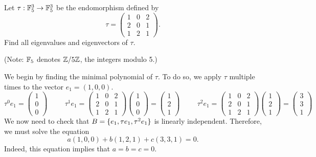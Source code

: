 \documentclass[notitlepage]{problem-solving}
\begin{document}
\begin{problem*}
	Let $\tau:\mathbb{F}_5^3\rightarrow\mathbb{F}_5^3$ be the endomorphism defined by
	\[
		\tau =
		\begin{pmatrix}
			1 & 0 & 2\\
			2 & 0 & 1\\
			1 & 2 & 1
		\end{pmatrix}.
	\]
	Find all eigenvalues and eigenvectors of $\tau$.

	(Note: $\mathbb{F}_5$ denotes $\mathbb{Z}/5\mathbb{Z}$, the integers modulo 5.)
\end{problem*}

We begin by finding the minimal polynomial of $\tau$.
To do so, we apply $\tau$ multiple times to the vector $e_1 = (1,0,0)$.
\[
	\tau^0 e_1 =
	\begin{pmatrix}
		1\\
		0\\
		0
	\end{pmatrix}
	\hspace{1cm}
	\tau^1 e_1 =
	\begin{pmatrix}
		1 & 0 & 2\\
		2 & 0 & 1\\
		1 & 2 & 1
	\end{pmatrix}
	\begin{pmatrix}
		1\\
		0\\
		0
	\end{pmatrix}
	=
	\begin{pmatrix}
		1\\
		2\\
		1
	\end{pmatrix}
	\hspace{1cm}
	\tau^2 e_1 =
	\begin{pmatrix}
		1 & 0 & 2\\
		2 & 0 & 1\\
		1 & 2 & 1
	\end{pmatrix}
	\begin{pmatrix}
		1\\
		2\\
		1
	\end{pmatrix}
	=
	\begin{pmatrix}
		3\\
		3\\
		1
	\end{pmatrix}
\]
We now need to check that $B=\lbrace e_1, \tau e_1, \tau^2 e_1 \rbrace$ is linearly independent.
Therefore, we must solve the equation
\[
	a(1,0,0)+b(1,2,1)+c(3,3,1)=0.
\]
Indeed, this equation implies that $a=b=c=0$.
\end{document}
